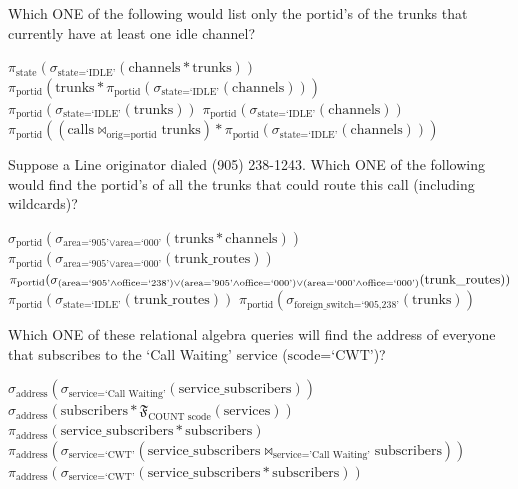\documentclass[12pt, answers]{exam}
\begin{document}
\begin{questions}
    \question[1] Which ONE of the following would list only the $\text{portid}$'s of the trunks that currently have at least one idle channel?
    \begin{choices}
        \choice $\pi_{\text{state}}(\sigma_{\text{state}=\text{`IDLE'}}(\text{channels} * \text{trunks}))$
        \CorrectChoice $\pi_{\text{portid}}(\text{trunks} * \pi_{\text{portid}}(\sigma_{\text{state}=\text{`IDLE'}}(\text{channels})))$
        \choice $\pi_{\text{portid}}(\sigma_{\text{state}=\text{`IDLE'}}(\text{trunks}))$
        \choice $\pi_{\text{portid}}(\sigma_{\text{state}=\text{`IDLE'}}(\text{channels}))$
        \choice $\pi_{\text{portid}}((\text{calls} \bowtie_{\text{orig}=\text{portid}} \text{trunks}) * \pi_{\text{portid}}(\sigma_{\text{state}=\text{`IDLE'}}(\text{channels})))$
    \end{choices}

    \question[1] Suppose a Line originator dialed (905) 238-1243. Which ONE of the following would find the $\text{portid}$'s of all the trunks that could route this call (including wildcards)?
    \begin{choices}
        \choice $\sigma_{\text{portid}}(\sigma_{\text{area=`905'} \lor \text{area=`000'}}(\text{trunks} * \text{channels}))$
        \choice $\pi_{\text{portid}}(\sigma_{\text{area=`905'} \lor \text{area=`000'}}(\text{trunk\_routes}))$
        \CorrectChoice $\pi_{\text{portid}}(\sigma_{(\text{area=`905'}
        \land \text{office=`238'}) \lor (\text{area='905'} \land \text{office=`000'}) \lor (\text{area=`000'} \land \text{office=`000'})}\newline (\text{trunk\_routes}))$
        \choice $\pi_{\text{portid}}(\sigma_{\text{state=`IDLE'}}(\text{trunk\_routes}))$
        \choice $\pi_{\text{portid}}(\sigma_{\text{foreign\_switch=`905,238'}}(\text{trunks}))$
    \end{choices}

    \question[1] Which ONE of these relational algebra queries will find the address of everyone that subscribes to the `Call Waiting' service ($\text{scode=`CWT'}$)?
    \begin{choices}
        \choice $\sigma_{\text{address}}(\sigma_{\text{service=`Call Waiting'}}(\text{service\_subscribers}))$
        \choice $\sigma_{\text{address}}(\text{subscribers} * \mathfrak{F}_{\text{COUNT scode}}(\text{services}))$
        \choice $\pi_{\text{address}}(\text{service\_subscribers} * \text{subscribers})$
        \choice $\pi_{\text{address}}(\sigma_{\text{service=`CWT'}}(\text{service\_subscribers} \bowtie_{\text{service='Call Waiting'}} \text{subscribers}))$
        \CorrectChoice $\pi_{\text{address}}(\sigma_{\text{service=`CWT'}}(\text{service\_subscribers} * \text{subscribers}))$
    \end{choices}
\end{questions}
\end{document}
